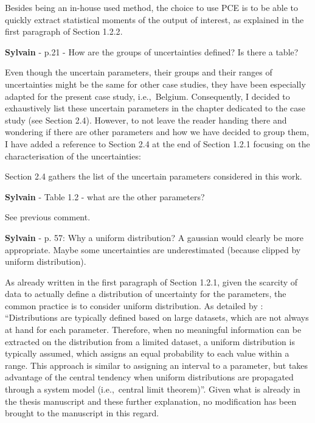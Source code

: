\documentclass[12pt,a4paper]{article}
\def\ie{i.e.,\ }
\begin{document}
\noindent Besides being an in-house used method, the choice to use PCE is to be able to quickly extract statistical moments of the output of interest, as explained {\color{blue}in the first paragraph of Section 1.2.2}.

\begin{mdframed}[style=comment] %
{\color{purple} \textbf{Sylvain}} - p.21 - How are the groups of uncertainties defined? Is there a table?
\end{mdframed}

\noindent Even though the uncertain parameters, their groups and their ranges of uncertainties might be the same for other case studies, they have been especially adapted for the present case study, \ie Belgium. Consequently, I decided to exhaustively list these uncertain parameters in the chapter dedicated to the case study (see Section 2.4). However, to not leave the reader handing there and wondering if there are other parameters and how we have decided to group them, I have added a reference to Section 2.4 {\color{blue}at the end of Section 1.2.1} focusing on the characterisation of the uncertainties:

\begin{mdframed}[style=manuscript] %
Section 2.4 gathers the list of the uncertain parameters considered in this work.
\end{mdframed}

\begin{mdframed}[style=comment] %
{\color{purple} \textbf{Sylvain}} - Table 1.2 - what are the other parameters?
\end{mdframed}

\noindent See previous comment.

\begin{mdframed}[style=comment] %
{\color{purple} \textbf{Sylvain}} - p. 57: Why a uniform distribution? A gaussian would clearly be more appropriate. Maybe some uncertainties are underestimated (because clipped by uniform distribution).
\end{mdframed}

\noindent As already written in the first paragraph of Section 1.2.1, given the scarcity of data to actually define a distribution of uncertainty for the parameters, the common practice is to consider uniform distribution. As detailed by \citet{coppittersthesis}: ``Distributions are typically defined based on large datasets, which are not always at hand for each parameter. Therefore, when no meaningful information can be extracted on the distribution from a limited dataset, a uniform distribution is typically assumed, which assigns an equal probability to each value within a range. This approach is similar to assigning an interval to a parameter, but takes advantage of the central tendency when uniform distributions are propagated through a system model (\ie central limit theorem)''. Given what is already in the thesis manuscript and these further explanation, no modification has been brought to the manuscript in this regard. 
\end{document}
